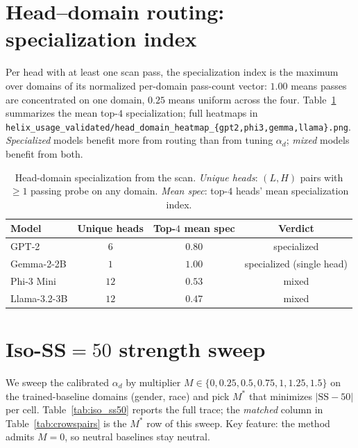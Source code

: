 \section{Head--domain routing: specialization index}
\label{app:routing}

Per head with at least one scan pass, the specialization index is the
maximum over domains of its normalized per-domain pass-count vector:
$1.00$ means passes are concentrated on one domain, $0.25$ means
uniform across the four. Table~\ref{tab:routing_spec} summarizes the
mean top-$4$ specialization; full heatmaps in
\texttt{helix\_usage\_validated/head\_domain\_heatmap\_\{gpt2,phi3,gemma,llama\}.png}.
\emph{Specialized} models benefit more from routing than from tuning
$\alpha_d$; \emph{mixed} models benefit from both.

\begin{table}[h]
\centering
\small
\caption{Head-domain specialization from the scan.
\emph{Unique heads}: $(L,H)$ pairs with $\geq 1$ passing probe on any
domain. \emph{Mean spec}: top-$4$ heads' mean specialization index.}
\label{tab:routing_spec}
\begin{tabular}{lccc}
\toprule
Model & Unique heads & Top-$4$ mean spec & Verdict \\
\midrule
GPT-2        & $6$  & $0.80$ & specialized \\
Gemma-2-2B   & $1$  & $1.00$ & specialized (single head) \\
Phi-3 Mini   & $12$ & $0.53$ & mixed \\
Llama-3.2-3B & $12$ & $0.47$ & mixed \\
\bottomrule
\end{tabular}
\end{table}

\section{Iso-SS$=50$ strength sweep}
\label{app:iso_ss50}

We sweep the calibrated $\alpha_d$ by multiplier $M \in \{0, 0.25,
0.5, 0.75, 1, 1.25, 1.5\}$ on the trained-baseline domains
(gender, race) and pick $M^*$ that minimizes $|\mathrm{SS}-50|$ per
cell. Table~\ref{tab:iso_ss50} reports the full trace; the
\emph{matched} column in Table~\ref{tab:crowspairs} is the $M^*$ row
of this sweep. Key feature: the method admits $M{=}0$, so neutral
baselines stay neutral.


